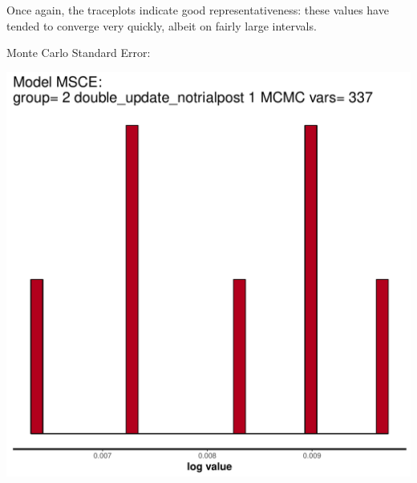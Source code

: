 \documentclass{article}\usepackage[]{graphicx}\usepackage[]{color}
\makeatletter
\def\maxwidth{ %
  \ifdim\Gin@nat@width>\linewidth
    \linewidth
  \else
    \Gin@nat@width
  \fi
}
\newenvironment{kframe}{%
 \def\at@end@of@kframe{}%
 \ifinner\ifhmode%
  \def\at@end@of@kframe{\end{minipage}}%
  \begin{minipage}{\columnwidth}%
 \fi\fi%
 \def\FrameCommand##1{\hskip\@totalleftmargin \hskip-\fboxsep
 \colorbox{shadecolor}{##1}\hskip-\fboxsep
     \hskip-\linewidth \hskip-\@totalleftmargin \hskip\columnwidth}%
 \MakeFramed {\advance\hsize-\width
   \@totalleftmargin\z@ \linewidth\hsize
   \@setminipage}}%
 {\par\unskip\endMakeFramed%
 \at@end@of@kframe}
\newenvironment{knitrout}{}{} %
\makeatother
\begin{document}
Once again, the traceplots indicate good representativeness: these values have tended to converge very quickly, albeit on fairly large intervals.

\begin{knitrout}
\color{fgcolor}\begin{kframe}


{\ttfamily\noindent\bfseries\color{errorcolor}{\#\# Error in xy.coords(x, y, xlabel, ylabel, log): 'x' and 'y' lengths differ}}\end{kframe}
\end{knitrout}

Monte Carlo Standard Error:

\begin{knitrout}
\color{fgcolor}
\includegraphics[width=\maxwidth]{figure/unnamed-chunk-12-1} 


\end{knitrout}
\end{document}
